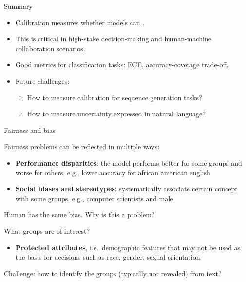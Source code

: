 \documentclass[usenames,dvipsnames,notes,11pt,aspectratio=169,hyperref={colorlinks=true, linkcolor=blue}]{beamer}
\begin{document}
\begin{frame}
    {Summary}

    \begin{itemize}
        \item Calibration measures whether models can .
        \item This is critical in high-stake decision-making and human-machine collaboration scenarios.
            \pause
        \item Good metrics for classification tasks: ECE, accuracy-coverage trade-off.
        \item Future challenges:\\
            \begin{itemize}
                \item How to measure calibration for sequence generation tasks?
                \item How to measure uncertainty expressed in natural language?
            \end{itemize}
    \end{itemize}
\end{frame}


\begin{frame}
    {Fairness and bias}

    Fairness problems can be reflected in multiple ways:\\
    \begin{itemize}
        \item {\bf Performance disparities}: the model performs better for some groups and worse for others, e.g., lower accuracy for african american english
        \item {\bf Social biases and stereotypes}: systematically associate certain concept with some groups, e.g., computer scientists and male
    \end{itemize}

    \pause
    Human has the same bias. Why is this a problem?\pause

    What groups are of interest?\\\pause
    \begin{itemize}
        \item {\bf Protected attributes}, i.e.\ demographic features that may not be used as the basis for decisions such as race, gender, sexual orientation.
    \end{itemize}

    Challenge: how to identify the groups (typically not revealed) from text?
\end{frame}
\end{document}
